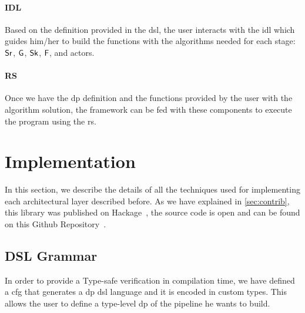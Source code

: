 \paragraph{IDL} Based on the definition provided in the \acrshort{dsl}, the user interacts with the \acrshort{idl} which guides him/her to build the functions with the algorithms needed for each stage: $\mathsf{Sr}$, $\mathsf{G}$, $\mathsf{Sk}$, $\mathsf{F}$, and actors. 

\paragraph{RS} Once we have the \acrshort{dp} definition and the functions provided by the user with the algorithm solution, the framework
can be fed with these components to execute the program using the \acrshort{rs}. 

\section{Implementation}
In this section, we describe the details of all the techniques used for implementing each architectural layer described before.
As we have explained in \autoref{sec:contrib}, this library was published on Hackage~\cite{dynamic-pipeline}, the source code is open and can be found on this Github Repository~\cite{dynamic-pipeline-git}.

\subsection{DSL Grammar}\label{sub:sec:dsl-gram}
In order to provide a Type-safe verification in compilation time, we have defined a \acrfull{cfg} that generates a \acrshort{dp} \acrshort{dsl} language and it is encoded in custom types. 
This allows the user to define a type-level \acrshort{dp} of the pipeline he wants to build. 

